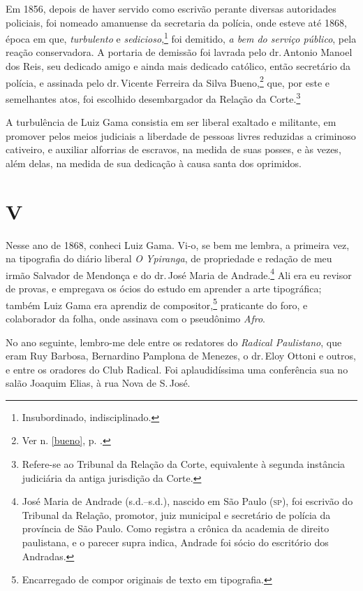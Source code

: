 Em 1856, depois de haver servido como escrivão perante diversas
autoridades policiais, foi nomeado amanuense da secretaria da polícia,
onde esteve até 1868, época em que, \emph{turbulento} e
\emph{sedicioso},\footnote{Insubordinado, indisciplinado.} foi
demitido, \emph{a bem do serviço público}, pela reação conservadora. A
portaria de demissão foi lavrada pelo dr.\,Antonio Manoel dos Reis, seu
dedicado amigo e ainda mais dedicado católico, então secretário da
polícia, e assinada pelo dr.\,Vicente Ferreira da Silva Bueno,\footnote{
  Ver n. \ref{bueno}, p. \pageref{bueno}.} que, por este e
semelhantes atos, foi escolhido desembargador da Relação da
Corte.\footnote{Refere-se ao Tribunal da Relação da Corte, equivalente
  à segunda instância judiciária da antiga jurisdição da Corte.}

A turbulência de Luiz Gama consistia em ser liberal exaltado e
militante, em promover pelos meios judiciais a liberdade de pessoas
livres reduzidas a criminoso cativeiro, e auxiliar alforrias de
escravos, na medida de suas posses, e às vezes, além delas, na medida de
sua dedicação à causa santa dos oprimidos.

\section*{V}

Nesse ano de 1868, conheci Luiz Gama. Vi-o, se bem me lembra, a primeira
vez, na tipografia do diário liberal \emph{O Ypiranga}, de propriedade e
redação de meu irmão Salvador de Mendonça e do dr.\,José Maria de
Andrade.\footnote{José Maria de Andrade (s.d.--s.d.), nascido em São \label{maria} %
  Paulo (\textsc{sp}), foi escrivão do Tribunal da Relação, promotor, juiz
  municipal e secretário de polícia da província de São Paulo. Como
  registra a crônica da academia de direito paulistana, e o parecer
  supra indica, Andrade foi sócio do escritório dos Andradas.} Ali era
eu revisor de provas, e empregava os ócios do estudo em aprender a arte
tipográfica; também Luiz Gama era aprendiz de compositor,\footnote{
  Encarregado de compor originais de texto em tipografia.} praticante
do foro, e colaborador da folha, onde assinava com o pseudônimo
\emph{Afro}.

No ano seguinte, lembro-me dele entre os redatores do \emph{Radical
Paulistano}, que eram Ruy Barbosa, Bernardino Pamplona de Menezes, o dr.\,Eloy Ottoni e outros, e entre os oradores do Club Radical. Foi
aplaudidíssima uma conferência sua no salão Joaquim Elias, à rua Nova de
S.\,José.

